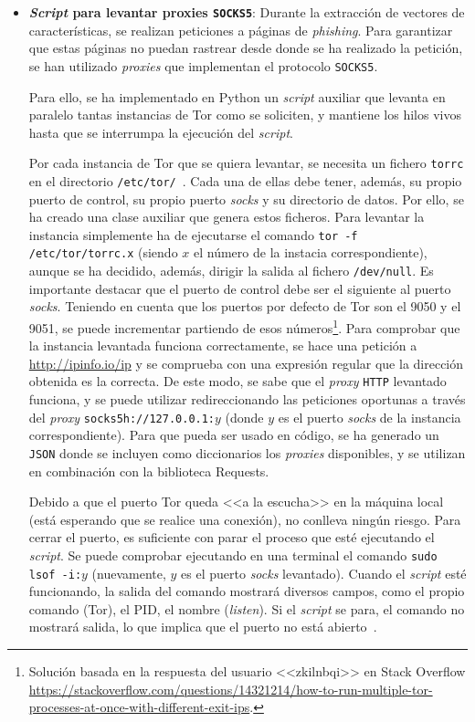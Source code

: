 \begin{itemize}
	\item \textbf{\textit{Script} para levantar proxies \texttt{SOCKS5}}:
	\label{sec:script_tor}
Durante la extracción de vectores de características, se realizan peticiones a páginas de \textit{phishing}. Para garantizar que estas páginas no puedan rastrear desde donde se ha realizado la petición, se han utilizado \textit{proxies} que implementan el protocolo \texttt{SOCKS5}.

Para ello, se ha implementado en Python un \textit{script} auxiliar que levanta en paralelo tantas instancias de Tor como se soliciten, y mantiene los hilos vivos hasta que se interrumpa la ejecución del \textit{script}.

Por cada instancia de Tor que se quiera levantar, se necesita un fichero \texttt{torrc} en el directorio \texttt{/etc/tor/}~\cite{TorFicherosTor}. Cada una de ellas debe tener, además, su propio puerto de control, su propio puerto \textit{socks} y su directorio de datos. Por ello, se ha creado una clase auxiliar que genera estos ficheros. Para levantar la instancia simplemente ha de ejecutarse el comando \texttt{tor -f /etc/tor/torrc.x} (siendo $x$ el número de la instacia correspondiente), aunque se ha decidido, además, dirigir la salida al fichero \texttt{/dev/null}. Es importante destacar que el puerto de control debe ser el siguiente al puerto \textit{socks}. Teniendo en cuenta que los puertos por defecto de Tor son el 9050 y el 9051, se puede incrementar partiendo de esos números\footnote{Solución basada en la respuesta del usuario <<zkilnbqi>> en Stack Overflow \url{https://stackoverflow.com/questions/14321214/how-to-run-multiple-tor-processes-at-once-with-different-exit-ips}.}. Para comprobar que la instancia levantada funciona correctamente, se hace una petición a \url{http://ipinfo.io/ip} y se comprueba con una expresión regular que la dirección obtenida es la correcta. De este modo, se sabe que el \textit{proxy} \texttt{HTTP} levantado funciona, y se puede utilizar redireccionando las peticiones oportunas a través del \textit{proxy} \texttt{socks5h://127.0.0.1:$y$} (donde $y$ es el puerto \textit{socks} de la instancia correspondiente). Para que pueda ser usado en código, se ha generado un \texttt{JSON} donde se incluyen como diccionarios los \textit{proxies} disponibles, y se utilizan en combinación con la biblioteca Requests.

Debido a que el puerto Tor queda <<a la escucha>> en la máquina local (está esperando que se realice una conexión), no conlleva ningún riesgo. Para cerrar el puerto, es suficiente con parar el proceso que esté ejecutando el \textit{script}. Se puede comprobar ejecutando en una terminal el comando \texttt{sudo lsof -i:$y$} (nuevamente, $y$ es el puerto \textit{socks} levantado). Cuando el \textit{script} esté funcionando, la salida del comando mostrará diversos campos, como el propio comando (Tor), el PID, el nombre (\textit{listen}). Si el \textit{script} se para, el comando no mostrará salida, lo que implica que el puerto no está abierto~\cite{checkOpenTorPorts}.


\end{itemize}
